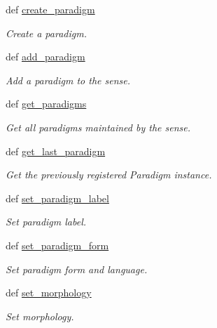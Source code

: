\begin{DoxyCompactItemize}
def \hyperlink{classlmf_1_1src_1_1core_1_1sense_1_1_sense_ac61f3aadccb06f636aad9891b3bba53e}{create\+\_\+paradigm}
\begin{DoxyCompactList}\small\item\em Create a paradigm. \end{DoxyCompactList}\item 
def \hyperlink{classlmf_1_1src_1_1core_1_1sense_1_1_sense_ae67664c5b120e407e5d0543ad5bdfb3d}{add\+\_\+paradigm}
\begin{DoxyCompactList}\small\item\em Add a paradigm to the sense. \end{DoxyCompactList}\item 
def \hyperlink{classlmf_1_1src_1_1core_1_1sense_1_1_sense_a41112d70652f5412eb71eacad72a135a}{get\+\_\+paradigms}
\begin{DoxyCompactList}\small\item\em Get all paradigms maintained by the sense. \end{DoxyCompactList}\item 
def \hyperlink{classlmf_1_1src_1_1core_1_1sense_1_1_sense_abdb32f5050397be1f2147b769fc97f6d}{get\+\_\+last\+\_\+paradigm}
\begin{DoxyCompactList}\small\item\em Get the previously registered Paradigm instance. \end{DoxyCompactList}\item 
def \hyperlink{classlmf_1_1src_1_1core_1_1sense_1_1_sense_ab30230d0322d864c2222ba5471f1a305}{set\+\_\+paradigm\+\_\+label}
\begin{DoxyCompactList}\small\item\em Set paradigm label. \end{DoxyCompactList}\item 
def \hyperlink{classlmf_1_1src_1_1core_1_1sense_1_1_sense_abe2105eb98e2fc6349fa82965ad58261}{set\+\_\+paradigm\+\_\+form}
\begin{DoxyCompactList}\small\item\em Set paradigm form and language. \end{DoxyCompactList}\item 
def \hyperlink{classlmf_1_1src_1_1core_1_1sense_1_1_sense_a4b47011de018711098677f188e973fca}{set\+\_\+morphology}
\begin{DoxyCompactList}\small\item\em Set morphology. \end{DoxyCompactList}\item 

\end{DoxyCompactItemize}
